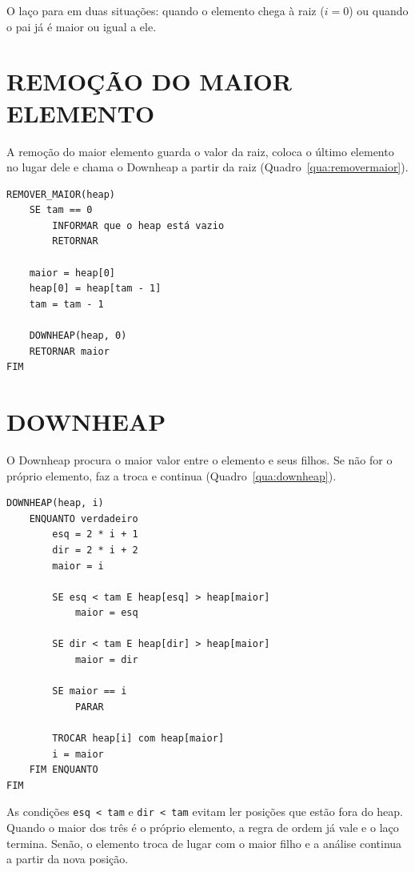 \documentclass[12pt,openany,oneside,a4paper,english,brazil,sumario=tradicional]{abntex2}
\begin{document}
O laço para em duas situações: quando o elemento chega à raiz ($i = 0$) ou quando o pai já é maior ou igual a ele.

\section{REMOÇÃO DO MAIOR ELEMENTO}

A remoção do maior elemento guarda o valor da raiz, coloca o último elemento no lugar dele e chama o Downheap a partir da raiz (Quadro~\ref{qua:removermaior}).

\begin{quadro}[htb]
\caption{\label{qua:removermaior}Pseudocódigo da remoção do maior elemento}
\begin{Verbatim}
REMOVER_MAIOR(heap)
    SE tam == 0
        INFORMAR que o heap está vazio
        RETORNAR

    maior = heap[0]
    heap[0] = heap[tam - 1]
    tam = tam - 1

    DOWNHEAP(heap, 0)
    RETORNAR maior
FIM
\end{Verbatim}
\end{quadro}

\section{DOWNHEAP}

O Downheap procura o maior valor entre o elemento e seus filhos. Se não for o próprio elemento, faz a troca e continua (Quadro~\ref{qua:downheap}).

\begin{quadro}[htb]
\caption{\label{qua:downheap}Pseudocódigo do Downheap}
\begin{Verbatim}
DOWNHEAP(heap, i)
    ENQUANTO verdadeiro
        esq = 2 * i + 1
        dir = 2 * i + 2
        maior = i

        SE esq < tam E heap[esq] > heap[maior]
            maior = esq

        SE dir < tam E heap[dir] > heap[maior]
            maior = dir

        SE maior == i
            PARAR

        TROCAR heap[i] com heap[maior]
        i = maior
    FIM ENQUANTO
FIM
\end{Verbatim}
\end{quadro}

As condições \texttt{esq < tam} e \texttt{dir < tam} evitam ler posições que estão fora do heap. Quando o maior dos três é o próprio elemento, a regra de ordem já vale e o laço termina. Senão, o elemento troca de lugar com o maior filho e a análise continua a partir da nova posição.
\end{document}
